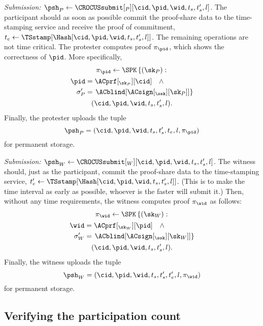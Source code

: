 \emph{Submission: \(\psh_P\gets \CROCUSsubmit[_P][\cid, \pid, \wid, t_s, t_s',  l]\).}
The participant should as soon as possible commit the proof-share data to the 
time-stamping service and receive the proof of commitment, \(t_e\gets 
  \TSstamp[\Hash[\cid, \pid, \wid, t_s, t_s', l]]\).
The remaining operations are not time critical.
The protester computes  proof \(\pi_{\pid}\), which shows the 
correctness of \(\pid\).
More specifically,
\begin{multline*}
  \pi_{\pid}\gets \SPK\left\{ (\sk_P) : \right. \\
    \begin{aligned}
      \pid &= \ACprf[_{\sk_P}][\cid] \quad \land \\
      \sigma_P' &= \left. \ACblind[\ACsign[_{\ssk}][\sk_P]] \right\}
    \end{aligned} \\
      (\cid, \pid, \wid, t_s, t_s', l).
\end{multline*}
Finally, the protester uploads the tuple \[  \psh_P = (\cid, \pid, \wid, t_s, t_s', t_e, l, \pi_{\pid})\] for permanent storage.

\emph{Submission: \(\psh_W\gets \CROCUSsubmit[_W][\cid, \pid, \wid, t_s, t_s', 
    l]\).}
The witness should, just as the participant, commit the proof-share data to the 
time-stamping service, \(t_e'\gets \TSstamp[\Hash[\cid, \pid, \wid, t_s, t_s', 
  l]]\).
(This is to make the time interval as early as possible, whoever is the faster 
will submit it.)
Then, without any time requirements, the witness computes  proof 
\(\pi_{\wid}\) as follows:
\begin{multline*}
  \pi_{\wid}\gets \SPK\left\{ (\sk_W) : \right. \\
    \begin{aligned}
      \wid &= \ACprf[_{\sk_W}][\pid] \quad \land \\
      \sigma_W' &= \left. \ACblind[\ACsign[_{\ssk}][\sk_W]] \right\}
    \end{aligned} \\
      (\cid, \pid, \wid, t_s, t_s', l).
\end{multline*}
Finally, the witness uploads the tuple \[ \psh_W = (\cid, \pid, \wid, t_s, 
  t_s', t_e', l, \pi_{\wid}) \] for permanent storage.

\subsection{Verifying the participation count}%
\label{ProtocolVerification}

